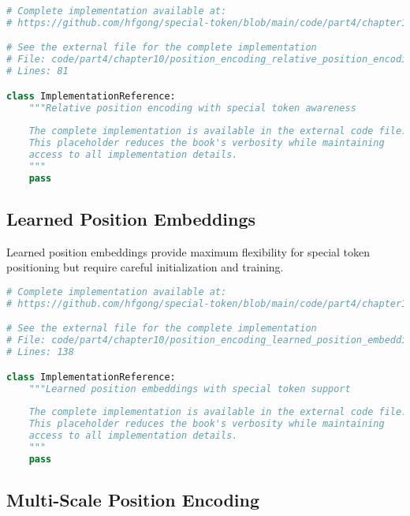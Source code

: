 \begin{lstlisting}[language=Python, caption={Relative position encoding with special token awareness}]
# Complete implementation available at:
# https://github.com/hfgong/special-token/blob/main/code/part4/chapter10/position_encoding_relative_position_encoding_wit.py

# See the external file for the complete implementation
# File: code/part4/chapter10/position_encoding_relative_position_encoding_wit.py
# Lines: 81

class ImplementationReference:
    """Relative position encoding with special token awareness
    
    The complete implementation is available in the external code file.
    This placeholder reduces the book's verbosity while maintaining
    access to all implementation details.
    """
    pass
\end{lstlisting}

\subsection{Learned Position Embeddings}

Learned position embeddings provide maximum flexibility for special token positioning but require careful initialization and training.

\begin{lstlisting}[language=Python, caption={Learned position embeddings with special token support}]
# Complete implementation available at:
# https://github.com/hfgong/special-token/blob/main/code/part4/chapter10/position_encoding_learned_position_embeddings_wi.py

# See the external file for the complete implementation
# File: code/part4/chapter10/position_encoding_learned_position_embeddings_wi.py
# Lines: 138

class ImplementationReference:
    """Learned position embeddings with special token support
    
    The complete implementation is available in the external code file.
    This placeholder reduces the book's verbosity while maintaining
    access to all implementation details.
    """
    pass
\end{lstlisting}

\subsection{Multi-Scale Position Encoding}

